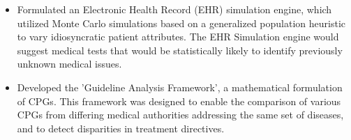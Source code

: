 \documentclass[10pt, letterpaper]{article}
\newcommand{\tabularxwidth}{\textwidth}
\begin{document}
\begin{minipage}{\tabularxwidth}
\begin{itemize}[noitemsep, topsep=3pt, parsep=0pt, partopsep=0pt]
                \item 
    Formulated an Electronic Health Record (EHR) simulation engine, which utilized Monte Carlo simulations based on a generalized population heuristic to vary idiosyncratic patient attributes. The EHR Simulation engine would suggest medical tests that would be statistically likely to identify previously unknown medical issues.
            
                \item 
    Developed the 'Guideline Analysis Framework', a mathematical formulation of CPGs. This framework was designed to enable the comparison of various CPGs from differing medical authorities addressing the same set of diseases, and to detect disparities in treatment directives.
            
        \end{itemize}

        
            \vspace{.5em}
        

    \end{minipage}
    
\end{document}
